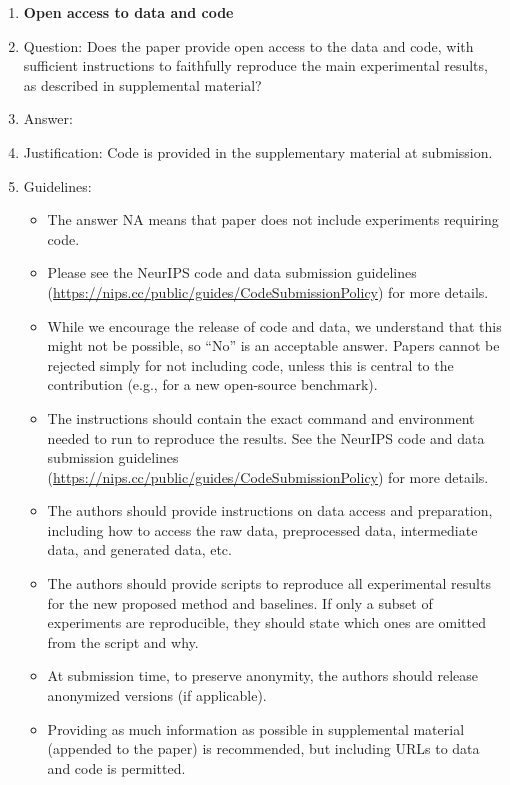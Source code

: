 \documentclass{article}
\theoremstyle{plain}
\theoremstyle{definition}
\theoremstyle{remark}
\begin{document}
\begin{enumerate}
\item {\bf Open access to data and code}
    \item[] Question: Does the paper provide open access to the data and code, with sufficient instructions to faithfully reproduce the main experimental results, as described in supplemental material?
    \item[] Answer: \answerYes{} %
    \item[] Justification: Code is provided in the supplementary material at submission.
    \item[] Guidelines:
    \begin{itemize}
        \item The answer NA means that paper does not include experiments requiring code.
        \item Please see the NeurIPS code and data submission guidelines (\url{https://nips.cc/public/guides/CodeSubmissionPolicy}) for more details.
        \item While we encourage the release of code and data, we understand that this might not be possible, so “No” is an acceptable answer. Papers cannot be rejected simply for not including code, unless this is central to the contribution (e.g., for a new open-source benchmark).
        \item The instructions should contain the exact command and environment needed to run to reproduce the results. See the NeurIPS code and data submission guidelines (\url{https://nips.cc/public/guides/CodeSubmissionPolicy}) for more details.
        \item The authors should provide instructions on data access and preparation, including how to access the raw data, preprocessed data, intermediate data, and generated data, etc.
        \item The authors should provide scripts to reproduce all experimental results for the new proposed method and baselines. If only a subset of experiments are reproducible, they should state which ones are omitted from the script and why.
        \item At submission time, to preserve anonymity, the authors should release anonymized versions (if applicable).
        \item Providing as much information as possible in supplemental material (appended to the paper) is recommended, but including URLs to data and code is permitted.
    \end{itemize}



\end{enumerate}
\end{document}
